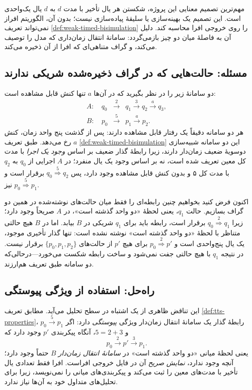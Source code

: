 مهم‌ترین تصمیم معنایی این پروژه، شکستن هر یال تأخیر با مدت $d$ به $d$ یال یک‌واحدی است. این تصمیم یک بهینه‌سازی یا سلیقهٔ پیاده‌سازی نیست؛ بدون آن، الگوریتم افراز نمی‌تواند تعریف \ref{def:weak-timed-bisimulation} را روی خروجی افرا محاسبه کند. دلیل آن به فاصلهٔ میان دو چیز بازمی‌گردد: سامانهٔ انتقال زمان‌داری که مدل را توصیف می‌کند، و گراف متناهی‌ای که افرا از آن ذخیره می‌کند.

\subsection{مسئله: حالت‌هایی که در گراف ذخیره‌شده شریکی ندارند}

دو سامانهٔ زیر را در نظر بگیرید که در آن‌ها $a$ تنها کنش قابل مشاهده است:
\[
\begin{array}{rcl}
A:\quad q_0 & \xrightarrow{2} & q_1\xrightarrow{3}q_2\xrightarrow{a}q_3,\\[2mm]
B:\quad p_0 & \xrightarrow{5} & p_1\xrightarrow{a}p_2.
\end{array}
\]
هر دو سامانه دقیقاً یک رفتار قابل مشاهده دارند: پس از گذشت پنج واحد زمان، کنش $a$ رخ می‌دهد. طبق تعریف \ref{def:weak-timed-bisimulation} این دو سامانه شبیه‌سازی دوسویهٔ ضعیف زمان‌دار دارند، زیرا رابطهٔ گذار ضعیف بر اساس \emph{وجود یک اجرا} با مدت کل معین تعریف شده است، نه بر اساس وجود یک یال منفرد؛ در $A$ اجرایی از $q_0$ به $q_2$ با مدت کل ۵ و بدون کنش قابل مشاهده وجود دارد، پس $q_0\overset{5}{\Rightarrow}q_2$ برقرار است و $p_0\overset{5}{\Rightarrow}p_1$ نیز.

اکنون فرض کنید بخواهیم چنین رابطه‌ای را فقط میان حالت‌های نوشته‌شده در همین دو گراف بسازیم. حالت $q_1$، یعنی لحظهٔ «دو واحد گذشته است»، در $A$ صریحاً وجود دارد؛ زیرا $q_0\overset{2}{\Rightarrow}q_1$ برقرار است، رابطه باید برای $q_1$ شریکی در $B$ بیابد. اما در $B$ هیچ حالتی متناظر با لحظهٔ «دو واحد گذشته است» نوشته نشده است: تنها گذار تأخیری موجود، یک یال پنج‌واحدی است و $p_0\overset{2}{\Rightarrow}p'$ برای هیچ $p'$ از حالت‌های $\{p_0,p_1,p_2\}$ برقرار نیست. در نتیجه $q_1$ با هیچ حالتی جفت نمی‌شود و ساخت رابطه شکست می‌خورد—درحالی‌که دو سامانه طبق تعریف هم‌ارزند.

\subsection{راه‌حل: استفاده از ویژگی پیوستگی}

این تناقض ظاهری از یک اشتباه در سطح تحلیل می‌آید. مطابق تعریف \ref{def:tts-properties}، رابطهٔ گذار یک سامانهٔ انتقال زمان‌دار ویژگی \emph{پیوستگی} دارد: اگر $p_0\xrightarrow{5}p_1$ و $5=2+3$، آنگاه پیکربندی $p'$ وجود دارد که
\[
p_0\xrightarrow{2}p'\xrightarrow{3}p_1 .
\]
یعنی لحظهٔ میانی «دو واحد گذشته است» در \emph{سامانهٔ انتقال زمان‌دار} $B$ حتماً وجود دارد؛ آنچه وجود ندارد، \emph{نمایش صریح} آن در فایل خروجی افراست. افرا فقط تعدادی یال تأخیر با مدت‌های معین را ثبت می‌کند و پیکربندی‌های میانی را نمی‌نویسد، زیرا برای تحلیل‌های متداول خود به آن‌ها نیاز ندارد.

